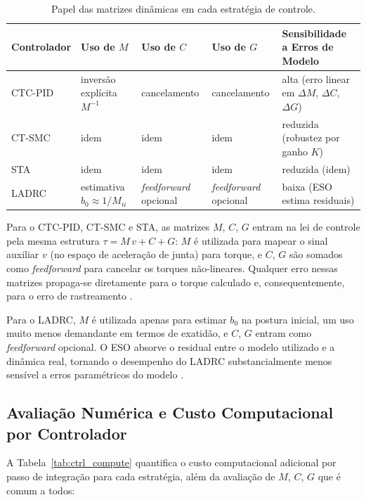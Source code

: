 \begin{table}[h!]
\centering
\caption{Papel das matrizes dinâmicas em cada estratégia de controle.}
\label{tab:ctrl_model_usage}
\small
\setlength{\tabcolsep}{4pt}
\begin{tabular}{p{2.4cm} p{2.4cm} p{2.4cm} p{2.4cm} p{3.2cm}}
\hline
\textbf{Controlador} & \textbf{Uso de $M$} & \textbf{Uso de $C$} & \textbf{Uso de $G$} & \textbf{Sensibilidade a Erros de Modelo} \\
\hline
CTC-PID & inversão explícita $M^{-1}$ & cancelamento & cancelamento & alta (erro linear em $\Delta M$, $\Delta C$, $\Delta G$) \\
CT-SMC & idem & idem & idem & reduzida (robustez por ganho $K$) \\
STA & idem & idem & idem & reduzida (idem) \\
LADRC & estimativa $b_0 \approx 1/M_{ii}$ & \textit{feedforward} opcional & \textit{feedforward} opcional & baixa (ESO estima residuais) \\
\hline
\end{tabular}
\end{table}

Para o CTC-PID, CT-SMC e STA, as matrizes $M$, $C$, $G$ entram na lei de controle pela mesma estrutura $\tau = M\,v + C + G$: $M$ é utilizada para mapear o sinal auxiliar $v$ (no espaço de aceleração de junta) para torque, e $C$, $G$ são somados como \textit{feedforward} para cancelar os torques não-lineares. Qualquer erro nessas matrizes propaga-se diretamente para o torque calculado e, consequentemente, para o erro de rastreamento \cite{spong2020robot}.

Para o LADRC, $M$ é utilizada apenas para estimar $b_0$ na postura inicial, um uso muito menos demandante em termos de exatidão, e $C$, $G$ entram como \textit{feedforward} opcional. O ESO absorve o residual entre o modelo utilizado e a dinâmica real, tornando o desempenho do LADRC substancialmente menos sensível a erros paramétricos do modelo \cite{gao2003scaling, madonski2019general}.

\subsection{Avaliação Numérica e Custo Computacional por Controlador}

A Tabela~\ref{tab:ctrl_compute} quantifica o custo computacional adicional por passo de integração para cada estratégia, além da avaliação de $M$, $C$, $G$ que é comum a todos:

